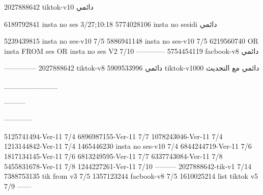 2027888642 tiktok-v10
دائمي

6189792841 insta no ses
3/27;10:18
5774028106 insta no sesidi
دائمي

5239439815 insta no ses-v10
7/5
5886941148 insta no ses-v10
7/5
6219560740 OR insta FROM ses OR insta no ses V2
7/10
------------
5754454119 facbook-v8
دائمي


--------------
2027888642 tiktok-v8
دائمي
5909533996 tiktok-v1000
دائمي مع التحديث

__________

---------

------------

5125741494-Ver-11
7/4
6896987155-Ver-11
7/7
1078243046-Ver-11
7/4
1213144842-Ver-11
7/4
1465446230 insta no ses-v10
7/4
6844244719-Ver-11
7/6
1817134145-Ver-11
7/6
6813249595-Ver-11
7/7
6337743084-Ver-11
7/8
5455831678-Ver-11
7/8
1244227261-Ver-11
7/10
---------
2027888642-tik-v1
7/14
7388753135 tik from v3
7/5
1357123244 facbook-v8
7/5
1610025214 list tiktok v5
7/9
------

